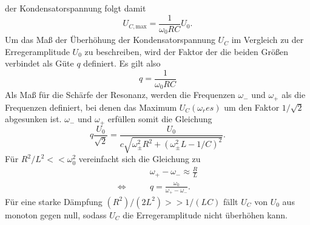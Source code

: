 der Kondensatorspannung folgt damit
\begin{equation*}
    U_{C, \text{max}} = \frac{1}{\omega_0 RC} U_0  .
\end{equation*}
Um das Maß der Überhöhung der Kondensatorspannung $U_C$ im Vergleich zu der Erregeramplitude $U_0$ zu beschreiben, wird der Faktor der die beiden
Größen verbindet als Güte $q$ definiert. Es gilt also
\begin{equation}
    q=\frac{1}{\omega_0RC}
    \label{eqn:gute}
\end{equation}
Als Maß für die Schärfe der Resonanz, werden die Frequenzen $\omega_-$ und $\omega_+$ als die Frequenzen definiert, bei denen das Maximum $U_C(\omega_res)$
um den Faktor $1/\sqrt{2}$ abgesunken ist. $\omega_-$ und $\omega_+$ erfüllen somit die Gleichung
\begin{equation}
    q\frac{U_0}{\sqrt{2}}=\frac{U_0}{c\sqrt{\omega_{\pm}^2R^2+(\omega_{\pm}^2L-1/C)^2}} .
    \label{eqn:plusminus}
\end{equation}
Für $R^2/L^2<<\omega_0^2$ vereinfacht sich die Gleichung zu
\begin{align*}
                    &\omega_+-\omega_-\approx \frac{R}{L} \\
    \Leftrightarrow \qquad &q=\frac{\omega_0}{\omega_+-\omega_-}    .
\end{align*}
Für eine starke Dämpfung $(R^2)/(2L^2)>>1/(LC)$ fällt $U_C$ von $U_0$ aus monoton gegen null, sodass $U_C$ die Erregeramplitude nicht überhöhen kann.
